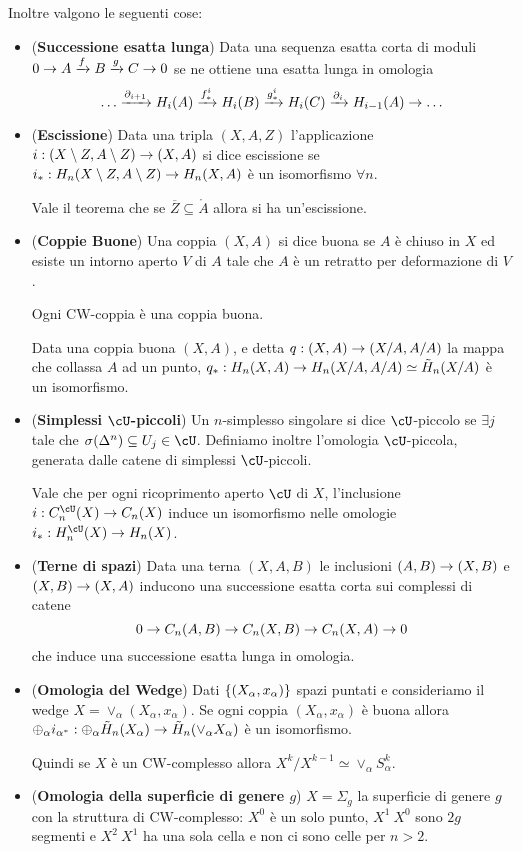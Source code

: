 \documentclass[a4paper,NoNotes,GeneralMath]{stdmdoc}
\let\xrar\xrightarrow
\begin{document}
Inoltre valgono le seguenti cose:
\begin{itemize}
\item ({\bf Successione esatta lunga}) Data una sequenza esatta corta di moduli $0 \rar A \xrar{f} B \xrar{g} C \rar 0$ se ne ottiene una esatta lunga in omologia
  $$ \ldots \xrar{\partial_{i+1}} H_i(A) \xrar{f^i_*} H_i(B) \xrar{g^i_*} H_i(C) \xrar{\partial_i} H_{i-1}(A) \rar \ldots $$
\item ({\bf Escissione}) Data una tripla $(X, A, Z)$ l'applicazione $i: (X \setminus Z, A \setminus Z) \rightarrow (X, A)$ si dice escissione se $i_*: H_n(X \setminus Z, A \setminus Z) \rightarrow H_n(X, A)$ è un isomorfismo $\forall n$.

  Vale il teorema che se $\overline{Z} \subseteq \mathring{A}$ allora si ha un'escissione.
\item ({\bf Coppie Buone}) Una coppia $(X, A)$ si dice buona se $A$ è chiuso in $X$ ed esiste un intorno aperto $V$ di $A$ tale che $A$ è un retratto per deformazione di $V$.

  Ogni CW-coppia è una coppia buona.

  Data una coppia buona $(X, A)$, e detta $q: (X, A) \rightarrow (X / A, A / A)$ la mappa che collassa $A$ ad un punto, $q_*: H_n(X, A) \rightarrow H_n(X / A, A / A) \simeq \tilde H_n(X / A)$ è un isomorfismo.
\item ({\bf Simplessi $\cU$-piccoli}) Un $n$-simplesso singolare si dice $\cU$-piccolo se $\exists j$ tale che $\sigma(\Delta^n) \subseteq U_j \in \cU$.
  Definiamo inoltre l'omologia $\cU$-piccola, generata dalle catene di simplessi $\cU$-piccoli.

  Vale che per ogni ricoprimento aperto $\cU$ di $X$, l'inclusione $i: C^{\cU}_n(X) \rar C_n(X)$ induce un isomorfismo nelle omologie $i_*: H^{\cU}_n(X) \rar H_n(X)$.
\item ({\bf Terne di spazi}) Data una terna $(X, A, B)$ le inclusioni $(A, B) \rightarrow (X, B)$ e $(X, B) \rightarrow (X, A)$ inducono una successione esatta corta sui complessi di catene
  $$ 0 \rightarrow C_n(A, B) \rightarrow C_n(X, B) \rightarrow C_n(X, A) \rightarrow 0 $$
  che induce una successione esatta lunga in omologia.
\item ({\bf Omologia del Wedge}) Dati $\left\{{(X_\alpha, x_\alpha)}\right\}$ spazi puntati e consideriamo il wedge $X = \vee_\alpha (X_\alpha, x_\alpha)$.
  Se ogni coppia $(X_\alpha, x_\alpha)$ è buona allora $\oplus_\alpha i_{\alpha^*}: \oplus_\alpha \tilde H_n(X_\alpha) \rightarrow \tilde H_n(\vee_\alpha X_\alpha)$ è un isomorfismo.

  Quindi se $X$ è un CW-complesso allora $X^k / X^{k-1} \simeq \vee_\alpha S^k_\alpha$.
\item ({\bf Omologia della superficie di genere $g$}) $X = \Sigma_g$ la superficie di genere $g$ con la struttura di CW-complesso: $X^0$ è un solo punto, $X^1 \ X^0$ sono $2g$ segmenti e $X^2 \ X^1$ ha una sola cella e non ci sono celle per $n > 2$.


\end{itemize}
\end{document}
